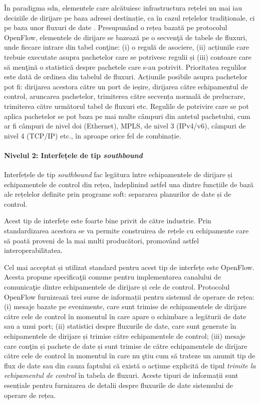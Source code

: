 În paradigma \gls{sdn}, elementele care alcătuiesc infrastructura rețelei nu mai iau deciziile de dirijare pe baza adresei destinație, ca în cazul rețelelor tradiționale, ci pe baza unor fluxuri de date \cite{mckeown2008openflow}. Presupunând o rețea bazată pe protocolul OpenFlow, elementele de dirijare se bazează pe o secvenţă de tabele de fluxuri, unde fiecare intrare din tabel conţine: (i) o regulă de asociere, (ii) acțiunile care trebuie executate asupra pachetelor care se potrivesc regulii și (iii) contoare care să menţină o statistică despre pachetele care s-au potrivit. Prioritatea regulilor este dată de ordinea din tabelul de fluxuri. Acțiunile posibile asupra pachetelor pot fi: dirijarea acestora către un port de ieșire, dirijarea către echipamentul de control, aruncarea pachetelor, trimiterea către secvența normală de prelucrare, trimiterea către următorul tabel de fluxuri etc. Regulile de potrivire care se pot aplica pachetelor se pot baza pe mai multe câmpuri din antetul pachetului, cum ar fi câmpuri de nivel doi (Ethernet), MPLS, de nivel 3 (IPv4/v6), câmpuri de nivel 4 (TCP/IP) etc., în aproape orice fel de combinație.

\paragraph{Nivelul 2: Interfețele de tip \textit{southbound}}

Interfețele de tip \textit{southbound} fac legătura între echipamentele de dirijare și echipamentele de control din rețea, îndeplinind astfel una dintre funcțiile de bază ale rețelelor definite prin programe soft: separarea planurilor de date și de control.

Acest tip de interfețe este foarte bine privit de către industrie. Prin standardizarea acestora se va permite construirea de rețele cu echipamente care să poată proveni de la mai multi producători, promovând astfel interoperabilitatea.

Cel mai acceptat și utilizat standard pentru acest tip de interfețe este OpenFlow. Acesta propune specificaţii comune pentru implementarea canalului de comunicaţie dintre echipamentele de dirijare și cele de control. Protocolul OpenFlow furnizează trei surse de informații pentru sistemul de operare de rețea: (i) mesaje bazate pe evenimente, care sunt trimise de echipamentele de dirijare către cele de control în momentul în care apare o schimbare a legăturii de date sau a unui port; (ii) statistici despre fluxurile de date, care sunt generate în echipamentele de dirijare și trimise către echipamentele de control; (iii) mesaje care conţin și pachete de date și sunt trimise de către echipamentele de dirijare către cele de control în momentul în care nu ştiu cum să trateze un anumit tip de flux de date sau din cauza faptului că există o acțiune explicită de tipul \textit{trimite la echipamentul de control} în tabela de fluxuri. Aceste tipuri de informații sunt esențiale pentru furnizarea de detalii despre fluxurile de date sistemului de operare de rețea.

